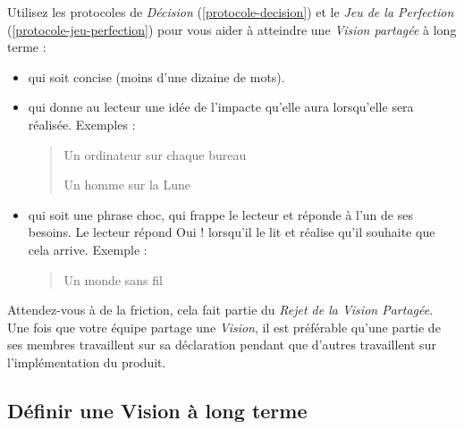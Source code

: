 \documentclass[paper=6in:9in,pagesize=pdftex,headinclude=on,footinclude=on,12pt]{scrbook}
\newcommand*{\numref}[1]{{\hyperref[{#1}]{\autoref*{#1}}}}
\begin{document}
Utilisez les protocoles de \emph{Décision} (\numref{protocole-decision}) et le \emph{Jeu de la Perfection} (\numref{protocole-jeu-perfection})
pour vous aider à atteindre une \emph{Vision partagée} à long terme :
\begin{itemize}
	\item qui soit concise (moins d'une dizaine de mots).
	\item qui donne au lecteur une idée de l'impacte qu'elle aura lorsqu'elle sera réalisée. Exemples :
		  \begin{quote}
		  	\og{}Un ordinateur sur chaque bureau\fg{}

		  	\og{}Un homme sur la Lune\fg{}
		  \end{quote}
	\item qui soit une phrase \og{}choc\fg{}, qui frappe le lecteur et réponde à l'un de ses besoins. Le lecteur répond \og{}Oui !\fg{}
	      lorsqu'il le lit et réalise qu'il souhaite que cela arrive. Exemple :
	      \begin{quote}
	      	\og{}Un monde sans fil\fg{}
	      \end{quote}
\end{itemize}

Attendez-vous à de la friction, cela fait partie du \emph{Rejet de la Vision Partagée}. Une fois que votre équipe partage une
\emph{Vision}, il est préférable qu'une partie de ses membres travaillent sur sa déclaration pendant que d'autres travaillent sur
l'implémentation du produit.

\subsection{Définir une Vision à long terme}
\end{document}
